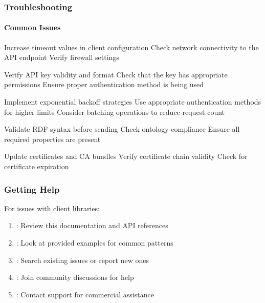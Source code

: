 \documentclass[letterpaper,10pt,english]{sphinxmanual}
\begin{document}
\subsubsection{Troubleshooting}
\label{\detokenize{api/client-libraries:troubleshooting}}

\paragraph{Common Issues}
\label{\detokenize{api/client-libraries:common-issues}}
\sphinxAtStartPar
{}
\sphinxhyphen{} Increase timeout values in client configuration
\sphinxhyphen{} Check network connectivity to the API endpoint
\sphinxhyphen{} Verify firewall settings

\sphinxAtStartPar
{}
\sphinxhyphen{} Verify API key validity and format
\sphinxhyphen{} Check that the key has appropriate permissions
\sphinxhyphen{} Ensure proper authentication method is being used

\sphinxAtStartPar
{}
\sphinxhyphen{} Implement exponential backoff strategies
\sphinxhyphen{} Use appropriate authentication methods for higher limits
\sphinxhyphen{} Consider batching operations to reduce request count

\sphinxAtStartPar
{}
\sphinxhyphen{} Validate RDF syntax before sending
\sphinxhyphen{} Check ontology compliance
\sphinxhyphen{} Ensure all required properties are present

\sphinxAtStartPar
{}
\sphinxhyphen{} Update certificates and CA bundles
\sphinxhyphen{} Verify certificate chain validity
\sphinxhyphen{} Check for certificate expiration


\subsubsection{Getting Help}
\label{\detokenize{api/client-libraries:getting-help}}
\sphinxAtStartPar
For issues with client libraries:
\begin{enumerate}
%
\item {} 
\sphinxAtStartPar
{}: Review this documentation and API references

\item {} 
\sphinxAtStartPar
{}: Look at provided examples for common patterns

\item {} 
\sphinxAtStartPar
{}: Search existing issues or report new ones

\item {} 
\sphinxAtStartPar
{}: Join community discussions for help

\item {} 
\sphinxAtStartPar
{}: Contact support for commercial assistance

\end{enumerate}
\end{document}

